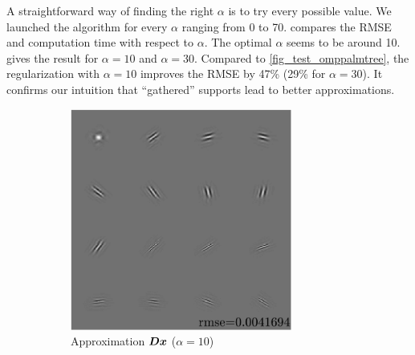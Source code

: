 A straightforward way of finding the right $\alpha$ is to try every possible value. We launched the algorithm for every $\alpha$ ranging from 0 to 70.  compares the RMSE and computation time with respect to $\alpha$. The optimal $\alpha$ seems to be around 10.
 gives the result for $\alpha=10$ and $\alpha=30$. Compared to \cref{fig_test_omppalmtree}, the regularization with $\alpha=10$ improves the RMSE by 47\% (29\% for $\alpha=30$). It confirms our intuition that “gathered” supports lead to better approximations.



\begin{figure}[!ht] \centering
\begin{subfigure}[b]{0.49\textwidth}\centering
\includegraphics[width=0.8\textwidth]{figures/tree-unbalanced-supp/xp_learnsupp256_curvelet_decomp3[tree-binary_dpth4]_supp-diracs_[usegrad1_every5_add5_totinit0_totadd279_alpha10]_approx.pdf}
\caption{Approximation $\bm{D}\bm{x}$ ($\alpha=10$)}\label{fig_test_omppalmtree2-approx_alpha10}
\end{subfigure}
\begin{subfigure}[b]{0.49\textwidth}\centering

\end{subfigure}
\end{figure}
